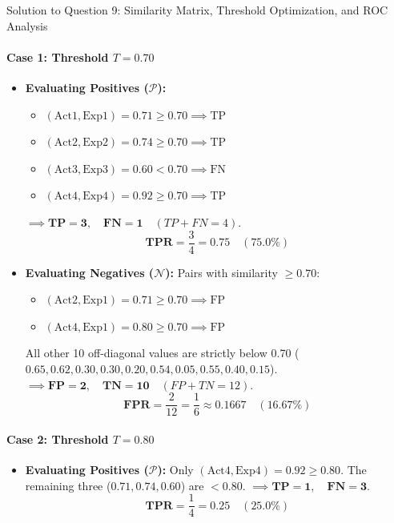 \documentclass[11pt,a4paper]{article}
\begin{document}
\begin{solutionbox}{Solution to Question 9: Similarity Matrix, Threshold Optimization, and ROC Analysis}
\paragraph{Case 1: Threshold $T = 0.70$}
\begin{itemize}[leftmargin=1.5em]
    \item \textbf{Evaluating Positives ($\mathcal{P}$):}
    \begin{itemize}
        \item $(\text{Act1}, \text{Exp1}) = 0.71 \ge 0.70 \implies \text{TP}$
        \item $(\text{Act2}, \text{Exp2}) = 0.74 \ge 0.70 \implies \text{TP}$
        \item $(\text{Act3}, \text{Exp3}) = 0.60 < 0.70 \implies \text{FN}$
        \item $(\text{Act4}, \text{Exp4}) = 0.92 \ge 0.70 \implies \text{TP}$
    \end{itemize}
    $\implies \mathbf{TP = 3}, \quad \mathbf{FN = 1} \quad (TP + FN = 4)$.
    \begin{equation*}
        \mathbf{TPR} = \frac{3}{4} = \mathbf{0.75} \quad (75.0\%)
    \end{equation*}

    \item \textbf{Evaluating Negatives ($\mathcal{N}$):}
    Pairs with similarity $\ge 0.70$:
    \begin{itemize}
        \item $(\text{Act2}, \text{Exp1}) = 0.71 \ge 0.70 \implies \text{FP}$
        \item $(\text{Act4}, \text{Exp1}) = 0.80 \ge 0.70 \implies \text{FP}$
    \end{itemize}
    All other 10 off-diagonal values are strictly below 0.70 ($0.65, 0.62, 0.30, 0.30, 0.20, 0.54, 0.05, 0.55, 0.40, 0.15$).
    $\implies \mathbf{FP = 2}, \quad \mathbf{TN = 10} \quad (FP + TN = 12)$.
    \begin{equation*}
        \mathbf{FPR} = \frac{2}{12} = \frac{1}{6} \approx \mathbf{0.1667} \quad (16.67\%)
    \end{equation*}
\end{itemize}

\paragraph{Case 2: Threshold $T = 0.80$}
\begin{itemize}[leftmargin=1.5em]
    \item \textbf{Evaluating Positives ($\mathcal{P}$):}
    Only $(\text{Act4}, \text{Exp4}) = 0.92 \ge 0.80$. The remaining three ($0.71, 0.74, 0.60$) are $< 0.80$.
    $\implies \mathbf{TP = 1}, \quad \mathbf{FN = 3}$.
    \begin{equation*}
        \mathbf{TPR} = \frac{1}{4} = \mathbf{0.25} \quad (25.0\%)
    \end{equation*}


\end{itemize}
\end{solutionbox}
\end{document}
